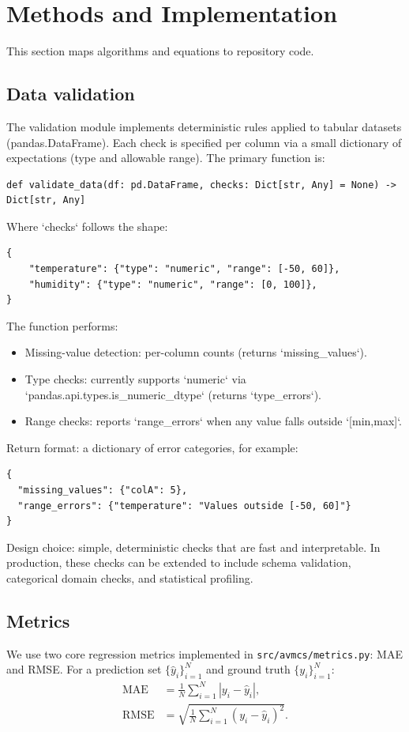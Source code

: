 \documentclass[11pt]{article}
\begin{document}
\section{Methods and Implementation}
This section maps algorithms and equations to repository code.

\subsection{Data validation}
The validation module implements deterministic rules applied to tabular datasets (pandas.DataFrame). Each check is specified per column via a small dictionary of expectations (type and allowable range). The primary function is:

\begin{verbatim}
def validate_data(df: pd.DataFrame, checks: Dict[str, Any] = None) -> Dict[str, Any]
\end{verbatim}

Where `checks` follows the shape:

\begin{verbatim}
{
    "temperature": {"type": "numeric", "range": [-50, 60]},
    "humidity": {"type": "numeric", "range": [0, 100]},
}
\end{verbatim}

The function performs:
\begin{itemize}
  \item Missing-value detection: per-column counts (returns `missing_values`).
  \item Type checks: currently supports `numeric` via `pandas.api.types.is_numeric_dtype` (returns `type_errors`).
  \item Range checks: reports `range_errors` when any value falls outside `[min,max]`.
\end{itemize}

Return format: a dictionary of error categories, for example:

\begin{verbatim}
{
  "missing_values": {"colA": 5},
  "range_errors": {"temperature": "Values outside [-50, 60]"}
}
\end{verbatim}

Design choice: simple, deterministic checks that are fast and interpretable. In production, these checks can be extended to include schema validation, categorical domain checks, and statistical profiling.

\subsection{Metrics}
We use two core regression metrics implemented in \texttt{src/avmcs/metrics.py}: MAE and RMSE. For a prediction set $\{\hat{y}_i\}_{i=1}^N$ and ground truth $\{y_i\}_{i=1}^N$:
\begin{align}
\text{MAE} &= \frac{1}{N} \sum_{i=1}^N |y_i - \hat{y}_i|, \\
\text{RMSE} &= \sqrt{\frac{1}{N} \sum_{i=1}^N (y_i - \hat{y}_i)^2 }.
\end{align}
\end{document}
